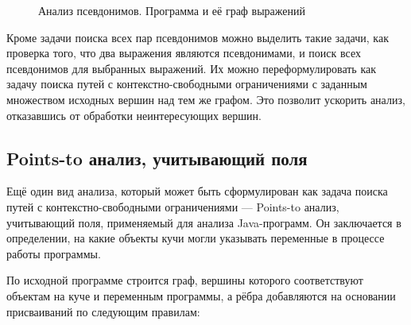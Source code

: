 \begin{figure}[]
\begin{subfigure}{.65\textwidth}
    \end{subfigure}
    \caption{Анализ псевдонимов. Программа и её граф выражений}
    \label{fig:andersen_pag}
\end{figure}


Кроме задачи поиска всех пар псевдонимов можно выделить такие задачи, как проверка того, что два выражения являются псевдонимами, и поиск всех псевдонимов для выбранных выражений. Их можно переформулировать как задачу поиска путей с контекстно-свободными ограничениями с заданным множеством исходных вершин над тем же графом. Это позволит ускорить анализ, отказавшись от обработки неинтересующих вершин.

\subsection{Points-to анализ, учитывающий поля}
Ещё один вид анализа, который может быть сформулирован как задача поиска путей с контекстно-свободными ограничениями --- Points-to анализ, учитывающий поля, применяемый для анализа Java-программ. Он заключается в определении, на какие объекты кучи могли указывать переменные в процессе работы программы.

По исходной программе строится граф, вершины которого соответствуют объектам на куче и переменным программы, а рёбра добавляются на основании присваиваний по следующим правилам:

